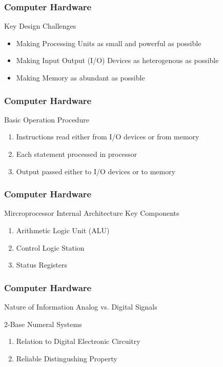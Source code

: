 \documentclass[10pt, compress]{beamer}
\begin{document}
\begin{frame}
	\frametitle{Computer Hardware}
	\begin{block}{Key Design Challenges}
		\begin{itemize}
			\item[] Making Processing Units as small and powerful as possible
			\item[] Making Input Output (I/O) Devices as heterogenous as possible
			\item[] Making Memory as abundant as possible
		\end{itemize}
	\end{block}
\end{frame}

\begin{frame}
	\frametitle{Computer Hardware}
	\begin{block}{Basic Operation Procedure}
		\begin{enumerate}
			\item[] Instructions read either from I/O devices or from memory
			\item[] Each statement processed in processor
			\item[] Output passed either to I/O devices or to memory
		\end{enumerate}
	\end{block}
\end{frame}

\begin{frame}
	\frametitle{Computer Hardware}
	\begin{block}{Mircroprocessor Internal Architecture}
		Key Components
		\begin{enumerate}
			\item[] Arithmetic Logic Unit (ALU)
			\item[] Control Logic Station
			\item[] Status Registers
		\end{enumerate}
	\end{block}
\end{frame}

\begin{frame}
	\frametitle{Computer Hardware}
	\begin{block}{Nature of Information}
		Analog vs. Digital Signals

		2-Base Numeral Systems
		\begin{enumerate}
			\item[] Relation to Digital Electronic Circuitry
			\item[] Reliable Distingushing Property
		\end{enumerate}
	\end{block}
\end{frame}

\end{document}
